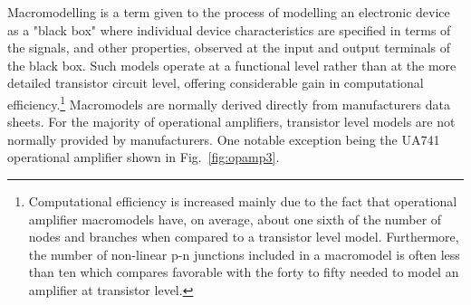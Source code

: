 
Macromodelling is a term given to the process of modelling an electronic device as a "black box" where individual device characteristics are specified in terms of the signals, and other properties, observed at the input and output terminals of the black box.  Such models operate at a functional level rather than at the more detailed transistor circuit level, offering considerable gain in computational efficiency.\footnote{  Computational efficiency is increased mainly due to the fact that operational amplifier macromodels have, on average, about one sixth of the number of nodes and branches when compared to a transistor level model.  Furthermore, the number of non-linear p-n junctions included in  a macromodel is often less than ten which compares favorable with the forty to fifty needed to model an amplifier at transistor level.}  Macromodels are normally derived directly from manufacturers data sheets.  For the majority of operational amplifiers, transistor level models are not normally provided by manufacturers.  One notable exception being the UA741 operational amplifier shown in Fig.~\ref{fig:opamp3}.\\
